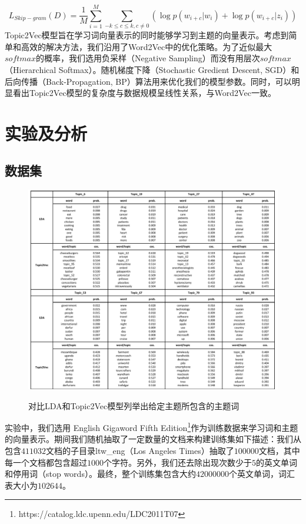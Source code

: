 \documentclass[master]{njuthesis}
\begin{document}
	\begin{equation}
	{L}_{Skip-gram}(D)=\frac{1}{M}\sum_{i=1}^{M}\sum_{-k\leq c\leq k,c\neq 0}(\log p(w_{i+c}|w_{i})+\log p(w_{i+c}|z_{i}))
	\end{equation}
Topic2Vec模型旨在学习词向量表示的同时能够学习到主题的向量表示。考虑到简单和高效的解决方法，我们沿用了Word2Vec中的优化策略。为了近似最大$softmax$的概率，我们选用负采样（Negative Sampling）而没有用层次$softmax$（Hierarchical Softmax）。随机梯度下降（Stochastic Gredient Descent, SGD）和后向传播（Back-Propagation, BP）算法用来优化我们的模型参数。同时，可以明显看出Topic2Vec模型的复杂度与数据规模呈线性关系，与Word2Vec一致。


\section{实验及分析}\label{sec_chap3}

\subsection{数据集}

\begin{figure}[t]
  \centering
  \includegraphics[width= 1.0\textwidth]{figures//topic_words_chap3.pdf}\\
  \caption{对比LDA和Topic2Vec模型列举出给定主题所包含的主题词}\label{fig:topic_words_chap3}
\end{figure}

实验中，我们选用 English Gigaword Fifth Edition\footnote{https://catalog.ldc.upenn.edu/LDC2011T07}作为训练数据来学习词和主题的向量表示。期间我们随机抽取了一定数量的文档来构建训练集如下描述：我们从包含$411032$文档的子目录ltw\_eng（Los Angeles Times）抽取了$100000$文档，其中每一个文档都包含超过$1000$个字符。另外，我们还去除出现次数少于$5$的英文单词和停用词（stop words）。最终，整个训练集包含大约$42000000$个英文单词，词汇表大小为$102644$。
\end{document}
